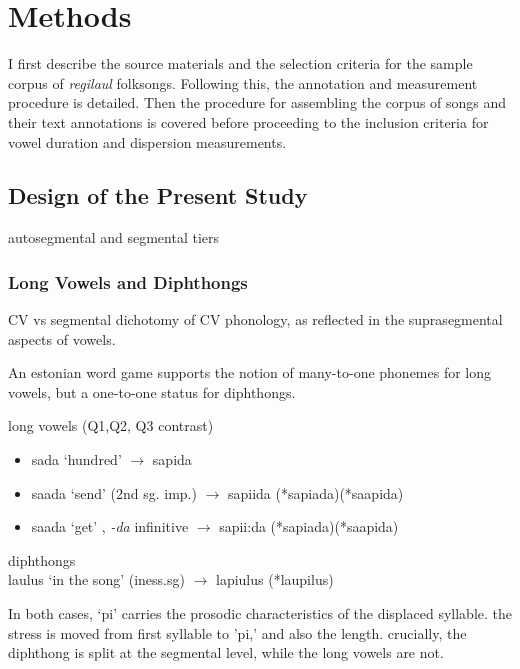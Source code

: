 \chapter{Methods}
%


I first describe the source materials and the selection criteria for the sample corpus of {\it regilaul} folksongs. Following this, the annotation and measurement procedure is detailed. Then the procedure for assembling the corpus of songs and their text annotations is covered before proceeding to the inclusion criteria for vowel duration and dispersion measurements.


\section{Design of the Present Study}

autosegmental and segmental tiers

\subsection{Long Vowels and Diphthongs}
CV vs segmental dichotomy of CV phonology, as reflected in the suprasegmental aspects of vowels. 

An estonian word game supports the notion of many-to-one phonemes for long vowels, but a one-to-one status for diphthongs.



\begin{exe}

\ex  long vowels (Q1,Q2, Q3 contrast) 
	\begin{itemize} 
	\item sada `hundred' $\rightarrow$ sapida 
	\item  saada `send' (2nd sg. imp.) $\rightarrow$ sapiida (*sapiada)(*saapida)
	\item saada `get' , {\it -da} infinitive $\rightarrow$ sapii:da (*sapiada)(*saapida)
	\end{itemize}
\ex 	 diphthongs \\
laulus `in the song' (iness.sg) $\rightarrow$ lapiulus (*laupilus)
\end{exe}

In both cases, `pi' carries the prosodic characteristics of the displaced syllable. the stress is moved from first syllable to 'pi,' and also the length. crucially, the diphthong is split at the segmental level, while the long vowels are not. 

